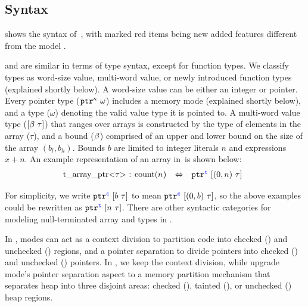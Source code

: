 \subsection{Syntax}\label{sec:syntax}
 shows the syntax of~\lang, with marked red items being new added features different from the \checkedc model \cite{li22checkedc}.

%
\systemname and \checkedc are similar in terms of type syntax, except for function types.
We classify types as word-size value, multi-word
value, or newly introduced function types (explained shortly below). A word-size value can be either an integer or pointer.
Every pointer type ($\mathtt{ptr}^{\kappa}~{\omega}$) includes a
memory mode (explained shortly below), and a type ($\omega$) denoting the valid value type it is pointed to.
A multi-word value type ($ [{\beta}~{\tau}]$) that ranges over 
arrays is constructed by the type of elements in the
array ($\tau$), and a bound ($\beta$) comprised of an upper and
lower bound on the size of the array $(b_l,b_h)$.
Bounds $b$ are
limited to integer literals $n$ and expressions $x + n$.
An example representation of an array in~\lang is shown below:
% 
\[\hspace*{-0.5em}
\begin{array}{l}
\begin{array}{rcl}
$\code{t_array_ptr<}$\tau$\code{> : count(}$n$\code{)}$
&\Leftrightarrow& \tarrayptr{0}{n}{\tau}{\tmode}
\end{array}
\end{array}
\]

For simplicity, we write
$\mathtt{ptr}^{\textcolor{blue}{\texttt{c}}}~{[{b}~{\tau}]}$ to mean $\mathtt{ptr}^{\textcolor{blue}{\texttt{c}}}~{[{({0},{b})}~{\tau}]}$,
so the above examples could be rewritten as $\mathtt{ptr}^{\textcolor{blue}{\texttt{t}}}~{[{n}~{\tau}]}$.
There are other syntactic categories for modeling null-terminated array and  types in .

%
In \checkedc, modes can act as a context division to partition code into checked (\cmode) and unchecked (\umode) regions, and a pointer separation to divide pointers into checked (\cmode) and unchecked (\umode) pointers.
In \systemname, we keep the context division, while upgrade mode's pointer separation aspect to a memory partition mechanism that separates heap into three disjoint areas: checked (\cmode), tainted (\tmode), or unchecked (\umode) heap regions.

